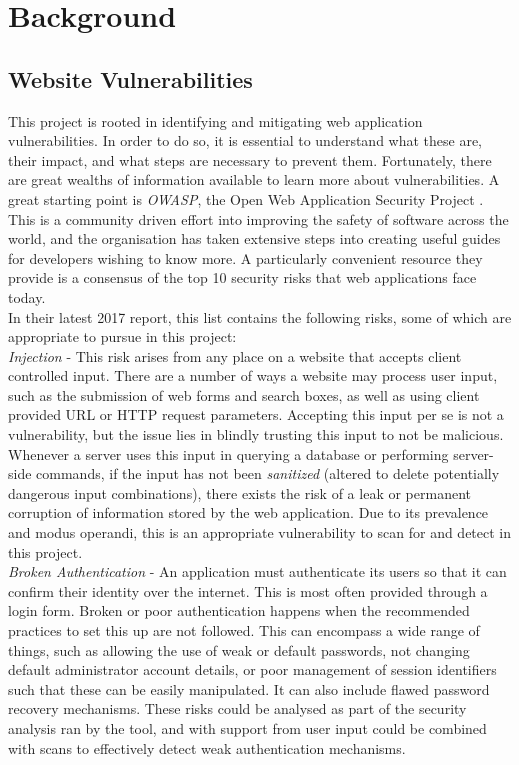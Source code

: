 \chapter{Background}

\section {Website Vulnerabilities}
\label{vulnerabilities}

This project is rooted in identifying and mitigating web application vulnerabilities. In order to do so, it is essential to understand what these are, their impact, and what steps are necessary to prevent them. Fortunately, there are great wealths of information available to learn more about vulnerabilities. A great starting point is \textit{OWASP}, the Open Web Application Security Project \cite{owaspPage}. This is a community driven effort into improving the safety of software across the world, and the organisation has taken extensive steps into creating useful guides for developers wishing to know more. A particularly convenient resource they provide is a consensus of the top 10 security risks that web applications face today. \\

In their latest 2017 report, this list contains the following risks, some of which are appropriate to pursue in this project: \\

	\emph{Injection} - This risk arises from any place on a website that accepts client controlled input. There are a number of ways a website may process user input, such as the submission of web forms and search boxes, as well as using client provided URL or HTTP request parameters. Accepting this input per se is not a vulnerability, but the issue lies in blindly trusting this input to not be malicious. Whenever a server uses this input in querying a database or performing server-side commands, if the input has not been \textit{sanitized} (altered to delete potentially dangerous input combinations), there exists the risk of a leak or permanent corruption of information stored by the web application. Due to its prevalence and modus operandi, this is an appropriate vulnerability to scan for and detect in this project. \\
	
	\emph{Broken Authentication} - An application must authenticate its users so that it can confirm their identity over the internet. This is most often provided through a login form. Broken or poor authentication happens when the recommended practices to set this up are not followed. This can encompass a wide range of things, such as allowing the use of weak or default passwords, not changing default administrator account details, or poor management of session identifiers such that these can be easily manipulated. It can also include flawed password recovery mechanisms. These risks could be analysed as part of the security analysis ran by the tool, and with support from user input could be combined with scans to effectively detect weak authentication mechanisms. \\
	
